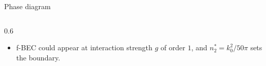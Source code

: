 \begin{frame}{Phase diagram}
\begin{columns}
\begin{column}{0.6\textwidth}
\begin{itemize}
        \vspace{5mm}
        
        \item f-BEC could appear at interaction strength $g$ of order $1$, and $n^*_2=k^2_0 / 50 \pi$ sets the boundary.
    \end{itemize} 
\end{column}
\end{columns}
\end{frame}
